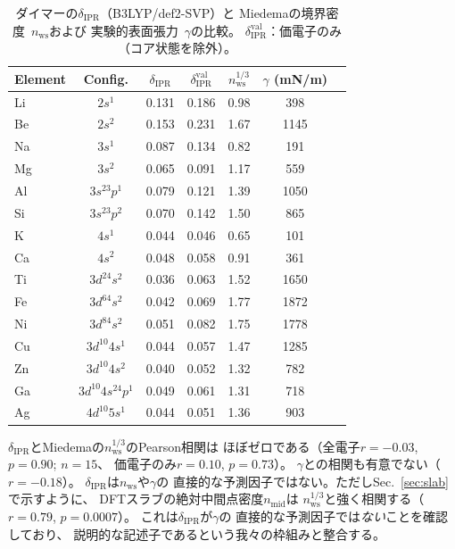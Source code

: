 \documentclass[twocolumn,showpacs,preprintnumbers,amsmath,amssymb,prb]{revtex4-2}
\begin{document}
\begin{table}[htb]
  \centering
  \caption{ダイマーの$\delta_\mathrm{IPR}$（B3LYP/def2-SVP）と
    Miedemaの境界密度~$n_\mathrm{ws}$および
    実験的表面張力~$\gamma$の比較。
    $\delta_\mathrm{IPR}^\mathrm{val}$：価電子のみ
    （コア状態を除外）。}
  \label{tab:delta_nws}
  \begin{ruledtabular}
  \begin{tabular}{lcccccc}
    Element & Config. & $\delta_\mathrm{IPR}$ &
      $\delta_\mathrm{IPR}^\mathrm{val}$ &
      $n_\mathrm{ws}^{1/3}$ & $\gamma$ (mN/m) \\
    \hline
    Li  & $2s^1$           & 0.131 & 0.186 & 0.98 &  398 \\
    Be  & $2s^2$           & 0.153 & 0.231 & 1.67 & 1145 \\
    Na  & $3s^1$           & 0.087 & 0.134 & 0.82 &  191 \\
    Mg  & $3s^2$           & 0.065 & 0.091 & 1.17 &  559 \\
    Al  & $3s^23p^1$       & 0.079 & 0.121 & 1.39 & 1050 \\
    Si  & $3s^23p^2$       & 0.070 & 0.142 & 1.50 &  865 \\
    K   & $4s^1$           & 0.044 & 0.046 & 0.65 &  101 \\
    Ca  & $4s^2$           & 0.048 & 0.058 & 0.91 &  361 \\
    Ti  & $3d^24s^2$       & 0.036 & 0.063 & 1.52 & 1650 \\
    Fe  & $3d^64s^2$       & 0.042 & 0.069 & 1.77 & 1872 \\
    Ni  & $3d^84s^2$       & 0.051 & 0.082 & 1.75 & 1778 \\
    Cu  & $3d^{10}4s^1$    & 0.044 & 0.057 & 1.47 & 1285 \\
    Zn  & $3d^{10}4s^2$    & 0.040 & 0.052 & 1.32 &  782 \\
    Ga  & $3d^{10}4s^24p^1$ & 0.049 & 0.061 & 1.31 &  718 \\
    Ag  & $4d^{10}5s^1$    & 0.044 & 0.051 & 1.36 &  903 \\
  \end{tabular}
  \end{ruledtabular}
\end{table}

$\delta_\mathrm{IPR}$とMiedemaの$n_\mathrm{ws}^{1/3}$のPearson相関は
ほぼゼロである（全電子$r = -0.03$, $p = 0.90$; $n = 15$、
価電子のみ$r = 0.10$, $p = 0.73$）。
$\gamma$との相関も有意でない（$r = -0.18$）。
$\delta_\mathrm{IPR}$は$n_\mathrm{ws}$や$\gamma$の
直接的な予測因子ではない。ただしSec.~\ref{sec:slab}で示すように、
DFTスラブの絶対中間点密度$n_\mathrm{mid}$は
$n_\mathrm{ws}^{1/3}$と強く相関する（$r = 0.79$, $p = 0.0007$）。
これは$\delta_\mathrm{IPR}$が$\gamma$の
直接的な予測因子では\emph{ない}ことを確認しており、
説明的な記述子であるという我々の枠組みと整合する。
\end{document}
